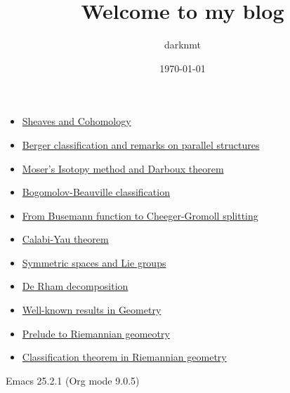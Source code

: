 \documentclass[11pt]{article}
\author{darknmt}
\date{\today}
\title{Welcome to my blog}
\begin{document}
\maketitle
\tableofcontents

\begin{itemize}
\item \href{sheaf-cohomology.org}{Sheaves and Cohomology}
\item \href{Berger-remark-complex.org}{Berger classification and remarks on parallel structures}
\item \href{isotopy-method-darboux-theorem.org}{Moser's Isotopy method and Darboux theorem}
\item \href{bogomolov-beauville.org}{Bogomolov-Beauville classification}
\item \href{Cheeger-Gromoll-splitting.org}{From Busemann function to Cheeger-Gromoll splitting}
\item \href{calabi-yau.org}{Calabi-Yau theorem}
\item \href{symmetric-space.org}{Symmetric spaces and Lie groups}
\item \href{de-rham-decomposition.org}{De Rham decomposition}
\item \href{culture-geometry.org}{Well-known results in Geometry}
\item \href{prelude-riemannian-geo.org}{Prelude to Riemannian geomeotry}
\item \href{Riemann-classification-theorem.org}{Classification theorem in Riemannian geometry}
\end{itemize}
Emacs 25.2.1 (Org mode 9.0.5)
\end{document}
